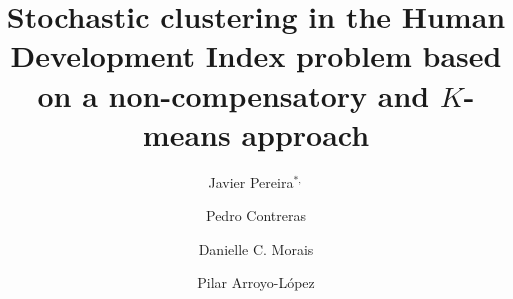 \documentclass[]{elsarticle}
\theoremstyle{definition}
\begin{document}
\begin{frontmatter}                           %


\title{Stochastic clustering in the Human Development Index problem based on a non-compensatory and $K$-means approach}



%

\author[utc]{Javier Pereira$^{*,}$\cortext[cor1]}
\author[ap]{Pedro Contreras}
\author[ufpe]{Danielle C. Morais}
\author[itesm]{Pilar Arroyo-L\'opez}




\address[utc]{Universidad Tecnol\'ogica de Chile Inacap, Santiago, Chile (xjavierpereira7@gmail.com); \\}
\address[ap]{WMG, The University of Warwick, UK (pedro.contreras@gmail.com);}
\address[ufpe]{Universidade Federal de Pernambuco, CDSID (dcmorais@cdsid.org.br);}
\address[itesm]{Tecnologico de Monterrey, Campus Toluca, M\'exico (pilar.arroyo@itesm.mx);}




\end{frontmatter}
\end{document}

